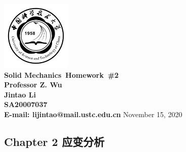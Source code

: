 \documentclass{article}
\makeatletter
\newcommand{\hmwkTitle}{Homework\ \#2}
\newcommand{\hmwkClass}{Solid Mechanics}
\newcommand{\hmwkClassInstructor}{Professor Z. Wu}
\newcommand{\hmwkAuthorName}{\textbf{Jintao Li}}
\newcommand{\hmwkAuthorID}{\textbf{SA20007037}}
\newcommand{\hmwkAuthoremail}{\textbf{E-mail: lijintao@mail.ustc.edu.cn}}
\makeatother
\begin{document}
\begin{titlepage}

\begin{center}

\textcolor{ustcblue}{\includegraphics[width=0.25\textwidth]{./ustc_logo_fig.pdf} \\ [1cm]}
{ \Huge \bfseries \hmwkClass\ \hmwkTitle}\\[1cm]

\large \textbf{\hmwkClassInstructor} \\ [5cm]

\large \hmwkAuthorName \\ [0.25cm]
\large \hmwkAuthorID \\ [0.25cm]
\large \hmwkAuthoremail
\vfill
{\large November 15, 2020}

\end{center}

\end{titlepage}

\begin{center}
\section{Chapter 2 应变分析}
\end{center}
\end{document}
